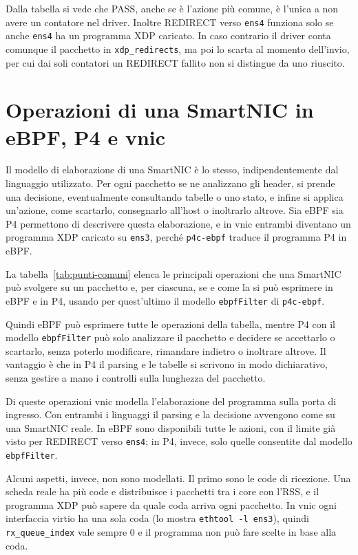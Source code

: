 Dalla tabella si vede che PASS, anche se è l'azione più comune, è l'unica a non avere un contatore nel driver. Inoltre REDIRECT verso \texttt{ens4} funziona solo se anche \texttt{ens4} ha un programma XDP caricato. In caso contrario il driver conta comunque il pacchetto in \texttt{xdp\_redirects}, ma poi lo scarta al momento dell'invio, per cui dai soli contatori un REDIRECT fallito non si distingue da uno riuscito.

\section{Operazioni di una SmartNIC in eBPF, P4 e vnic}\label{sec:punti-comuni}

Il modello di elaborazione di una SmartNIC è lo stesso, indipendentemente dal linguaggio utilizzato. Per ogni pacchetto se ne analizzano gli header, si prende una decisione, eventualmente consultando tabelle o uno stato, e infine si applica un'azione, come scartarlo, consegnarlo all'host o inoltrarlo altrove. Sia eBPF sia P4 permettono di descrivere questa elaborazione, e in vnic entrambi diventano un programma XDP caricato su \texttt{ens3}, perché \texttt{p4c-ebpf} traduce il programma P4 in eBPF.

La tabella~\ref{tab:punti-comuni} elenca le principali operazioni che una SmartNIC può svolgere su un pacchetto e, per ciascuna, se e come la si può esprimere in eBPF e in P4, usando per quest'ultimo il modello \texttt{ebpfFilter} di \texttt{p4c-ebpf}.



Quindi eBPF può esprimere tutte le operazioni della tabella, mentre P4 con il modello \texttt{ebpfFilter} può solo analizzare il pacchetto e decidere se accettarlo o scartarlo, senza poterlo modificare, rimandare indietro o inoltrare altrove. Il vantaggio è che in P4 il parsing e le tabelle si scrivono in modo dichiarativo, senza gestire a mano i controlli sulla lunghezza del pacchetto.

Di queste operazioni vnic modella l'elaborazione del programma sulla porta di ingresso. Con entrambi i linguaggi il parsing e la decisione avvengono come su una SmartNIC reale. In eBPF sono disponibili tutte le azioni, con il limite già visto per REDIRECT verso \texttt{ens4}; in P4, invece, solo quelle consentite dal modello \texttt{ebpfFilter}.

Alcuni aspetti, invece, non sono modellati. Il primo sono le code di ricezione. Una scheda reale ha più code e distribuisce i pacchetti tra i core con l'RSS, e il programma XDP può sapere da quale coda arriva ogni pacchetto. In vnic ogni interfaccia virtio ha una sola coda (lo mostra \texttt{ethtool -l ens3}), quindi \texttt{rx\_queue\_index} vale sempre 0 e il programma non può fare scelte in base alla coda.

